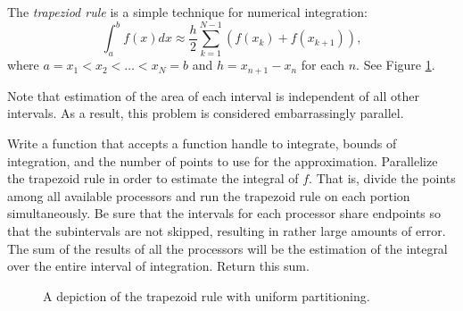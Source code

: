 \begin{problem}
The \emph{trapeziod rule} is a simple technique for numerical integration:
\[
\int_{a}^b f(x) dx \approx \frac{h}{2} \sum_{k=1}^{N-1} (f(x_{k}) + f(x_{k+1})),
\]
where $a = x_1 < x_2 < \ldots < x_N = b$ and $h = x_{n+1} - x_{n}$ for each $n$.
See Figure \ref{fig:parallel-intro-traprule}.


Note that estimation of the area of each interval is independent of all other intervals.
As a result, this problem is considered embarrassingly parallel.

Write a function that accepts a function handle to integrate, bounds of integration, and the number of points to use for the approximation.
Parallelize the trapezoid rule in order to estimate the integral of $f$.
That is, divide the points among all available processors and run the trapezoid rule on each portion simultaneously.
Be sure that the intervals for each processor share endpoints so that the subintervals are not skipped, resulting in rather large amounts of error.
The sum of the results of all the processors will be the estimation of the integral over the entire interval of integration.
Return this sum.

\begin{figure}[H]

\begin{center}

\end{center}
\caption{A depiction of the trapezoid rule with uniform partitioning.}
\label{fig:parallel-intro-traprule}
\end{figure}
\end{problem}


